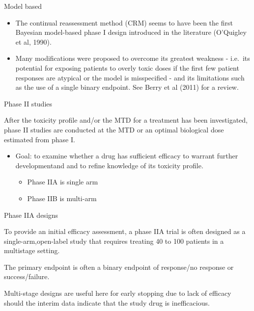 \documentclass{beamer}
\begin{document}
\begin{frame}{Model based}

\begin{itemize}
\item
  The continual reassessment method (CRM) seems to have been the first
  Bayesian model-based phase I design introduced in the literature
  (O'Quigley et al, 1990).
\item
  Many modifications were proposed to overcome its greatest weakness -
  i.e.~its potential for exposing patients to overly toxic doses if the
  first few patient responses are atypical or the model is misspecified
  - and its limitations such as the use of a single binary endpoint. See
  Berry et al (2011) for a review.
\end{itemize}

\end{frame}

\begin{frame}{Phase II studies}

After the toxicity profile and/or the MTD for a treatment has been
investigated, phase II studies are conducted at the MTD or an optimal
biological dose estimated from phase I.

\begin{itemize}
\itemsep1pt\parskip0pt
\item
  Goal: to examine whether a drug has sufficient efficacy to warrant
  further developmentand and to refine knowledge of its toxicity
  profile.

  \begin{itemize}
  \itemsep1pt\parskip0pt
  \item
    Phase IIA is single arm
  \item
    Phase IIB is multi-arm
  \end{itemize}
\end{itemize}

\end{frame}

\begin{frame}{Phase IIA designs}

To provide an initial efficacy assessment, a phase IIA trial is often
designed as a single-arm,open-label study that requires treating 40 to
100 patients in a multistage setting.

The primary endpoint is often a binary endpoint of response/no response
or success/failure.

Multi-stage designs are useful here for early stopping due to lack of
efficacy should the interim data indicate that the study drug is
inefficacious.

\end{frame}
\end{document}
